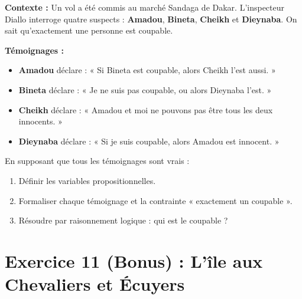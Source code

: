 \documentclass[11pt,a4paper]{article}
\begin{document}
\begin{exercice}
\textbf{Contexte :} Un vol a été commis au marché Sandaga de Dakar. L'inspecteur Diallo interroge quatre suspects : \textbf{Amadou}, \textbf{Bineta}, \textbf{Cheikh} et \textbf{Dieynaba}. On sait qu'exactement une personne est coupable.

\textbf{Témoignages :}
\begin{itemize}
    \item \textbf{Amadou} déclare : « Si Bineta est coupable, alors Cheikh l'est aussi. »
    \item \textbf{Bineta} déclare : « Je ne suis pas coupable, ou alors Dieynaba l'est. »
    \item \textbf{Cheikh} déclare : « Amadou et moi ne pouvons pas être tous les deux innocents. »
    \item \textbf{Dieynaba} déclare : « Si je suis coupable, alors Amadou est innocent. »
\end{itemize}

En supposant que tous les témoignages sont vrais :
\begin{enumerate}[label=\alph*)]
    \item Définir les variables propositionnelles.
    \item Formaliser chaque témoignage et la contrainte « exactement un coupable ».
    \item Résoudre par raisonnement logique : qui est le coupable ?
\end{enumerate}
\end{exercice}

\section*{Exercice 11 (Bonus) : L'île aux Chevaliers et Écuyers}
\end{document}
